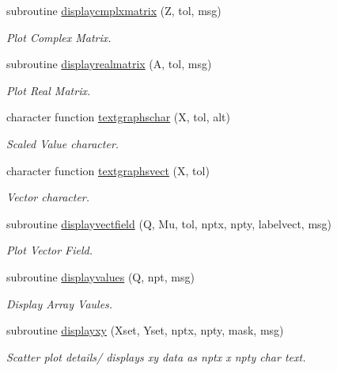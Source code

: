 \begin{DoxyCompactItemize}
\item 
subroutine \hyperlink{namespacetextgraphs_a34e0dbcefa5d7f20393912bea281116e}{displaycmplxmatrix} (Z, tol, msg)
\begin{DoxyCompactList}\small\item\em Plot Complex Matrix. \end{DoxyCompactList}\item 
subroutine \hyperlink{namespacetextgraphs_aec95adcc32b77f95f0a3625ca97cc374}{displayrealmatrix} (A, tol, msg)
\begin{DoxyCompactList}\small\item\em Plot Real Matrix. \end{DoxyCompactList}\item 
character function \hyperlink{namespacetextgraphs_accad584018d6cbbc199cc77b34ef2db5}{textgraphschar} (X, tol, alt)
\begin{DoxyCompactList}\small\item\em Scaled Value character. \end{DoxyCompactList}\item 
character function \hyperlink{namespacetextgraphs_a3ce903686e3a69e50f07b7f1461c53c6}{textgraphsvect} (X, tol)
\begin{DoxyCompactList}\small\item\em Vector character. \end{DoxyCompactList}\item 
subroutine \hyperlink{namespacetextgraphs_ae7171ed6f50b5b8b77aabd136316a6b8}{displayvectfield} (Q, Mu, tol, nptx, npty, labelvect, msg)
\begin{DoxyCompactList}\small\item\em Plot Vector Field. \end{DoxyCompactList}\item 
subroutine \hyperlink{namespacetextgraphs_a7f733ce4082530e8bfeb1750d4870575}{displayvalues} (Q, npt, msg)
\begin{DoxyCompactList}\small\item\em Display Array Vaules. \end{DoxyCompactList}\item 
subroutine \hyperlink{namespacetextgraphs_a857fceafb9446a13966f54fbbce35773}{displayxy} (Xset, Yset, nptx, npty, mask, msg)
\begin{DoxyCompactList}\small\item\em Scatter plot details/ displays xy data as nptx x npty char text. \end{DoxyCompactList}\end{DoxyCompactItemize}


